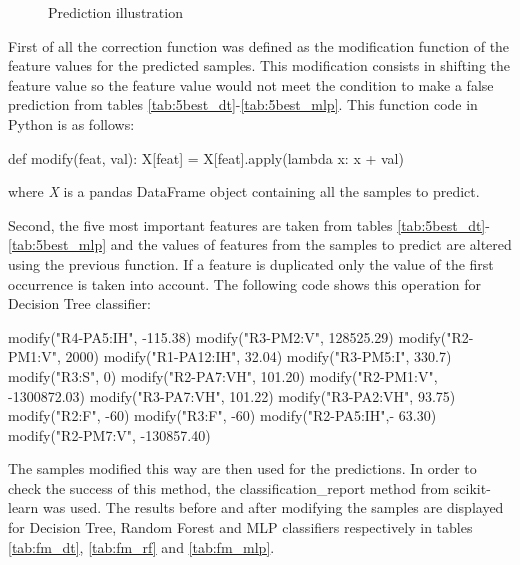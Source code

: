 \begin{figure}[H]
    \centering
    \caption{Prediction illustration} \label{fig:predict}
\end{figure}

First of all the correction function was defined as the modification function of the feature values for the predicted samples. This modification consists in shifting the feature value so the feature value would not meet the condition to make a false prediction from tables \ref{tab:5best_dt}-\ref{tab:5best_mlp}. This function code in Python is as follows:  
\begin{python}
def modify(feat, val):
    X[feat] = X[feat].apply(lambda x: x + val)
\end{python}
where \textit{X} is a pandas DataFrame object containing all the samples to predict.

Second, the five most important features are taken from tables \ref{tab:5best_dt}-\ref{tab:5best_mlp} and the values of features from the samples to predict are altered using the previous function. If a feature is duplicated only the value of the first occurrence is taken into account. The following code shows this operation for Decision Tree classifier:

\begin{python}
modify("R4-PA5:IH", -115.38)
modify("R3-PM2:V", 128525.29)
modify("R2-PM1:V", 2000)
modify("R1-PA12:IH", 32.04)
modify("R3-PM5:I", 330.7)
modify("R3:S", 0)
modify("R2-PA7:VH", 101.20)
modify("R2-PM1:V", -1300872.03)
modify("R3-PA7:VH", 101.22)
modify("R3-PA2:VH", 93.75)    
modify("R2:F", -60)
modify("R3:F", -60)
modify("R2-PA5:IH",- 63.30)
modify("R2-PM7:V", -130857.40) 
\end{python}

The samples modified this way are then used for the predictions. In order to check the success of this method, the classification\_report method from scikit-learn was used. The results before and after modifying the samples are displayed for Decision Tree, Random Forest and MLP classifiers respectively in tables \ref{tab:fm_dt}, \ref{tab:fm_rf} and \ref{tab:fm_mlp}.

